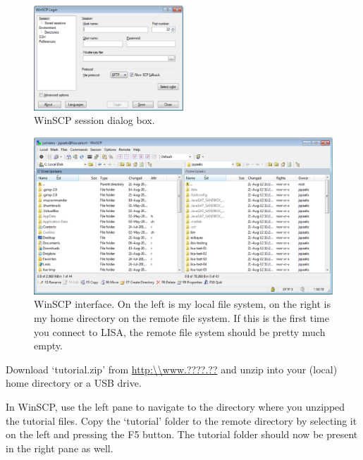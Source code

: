\begin{figure}[htbp]
  \centering
    \includegraphics[width=0.5\textwidth]{./../eps/winscp-session-dialog.eps}
  \caption{WinSCP session dialog box.}
  \label{fig:winscp-session-dialog}
\end{figure}

\begin{figure}[htbp]
  \centering
    \includegraphics[width=1.0\textwidth]{./../eps/winscp-two-panes.eps}
  \caption{WinSCP interface. On the left is my local file system, on the right is my home directory on the remote file system. If this is the first time you connect to LISA, the remote file system should be pretty much empty.}
  \label{fig:winscp-two-panes}
\end{figure}

Download `tutorial.zip' from \url{http:\\www.????.??} and unzip into your (local) home directory or a USB drive.

In WinSCP, use the left pane to navigate to the directory where you unzipped the tutorial files. Copy the `tutorial' folder to the remote directory by selecting it on the left and pressing the F5 button. The tutorial folder should now be present in the right pane as well.


